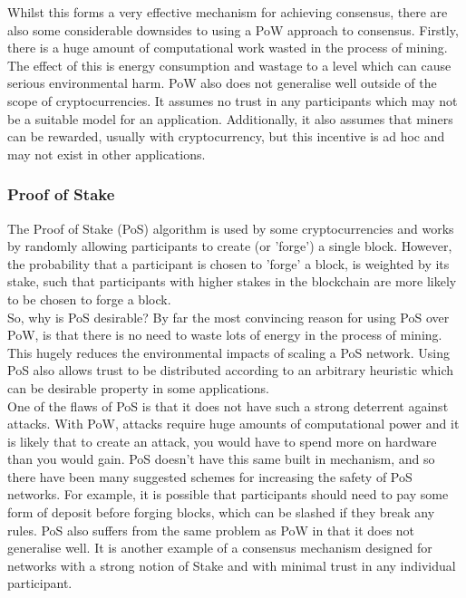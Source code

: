 \documentclass[12pt,a4paper,twoside,openright]{report}
\begin{document}
			Whilst this forms a very effective mechanism for achieving consensus, there are also some considerable downsides to using a PoW approach to consensus. 
			Firstly, there is a huge amount of computational work wasted in the process of mining. 
			The effect of this is energy consumption \cite{BitcoinEnergy} and wastage to a level which can cause serious environmental harm.
			PoW also does not generalise well outside of the scope of cryptocurrencies.
			It assumes no trust in any participants which may not be a suitable model for an application. 
			Additionally, it also assumes that miners can be rewarded, usually with cryptocurrency, but this incentive is ad hoc and may not exist in other applications. 

			\subsubsection*{Proof of Stake}
			The Proof of Stake (PoS) algorithm is used by some cryptocurrencies and works by randomly allowing participants to create (or 'forge') a single block.
			However, the probability that a participant is chosen to 'forge' a block, is weighted by its stake, such that participants with higher stakes in the blockchain are more likely to be chosen to forge a block.\\

			So, why is PoS desirable? 
			By far the most convincing reason for using PoS over PoW, is that there is no need to waste lots of energy in the process of mining. 
			This hugely reduces the environmental impacts of scaling a PoS network.
			Using PoS also allows trust to be distributed according to an arbitrary heuristic which can be desirable property in some applications.\\

			One of the flaws of PoS is that it does not have such a strong deterrent against attacks.
			With PoW, attacks require huge amounts of computational power and it is likely that to create an attack, you would have to spend more on hardware than you would gain. 
			PoS doesn't have this same built in mechanism, and so there have been many suggested schemes for increasing the safety of PoS networks.
			For example, it is possible that participants should need to pay some form of deposit before forging blocks, which can be slashed if they break any rules. 
			PoS also suffers from the same problem as PoW in that it does not generalise well. 
			It is another example of a consensus mechanism designed for networks with a strong notion of Stake and with minimal trust in any individual participant.
\end{document}
